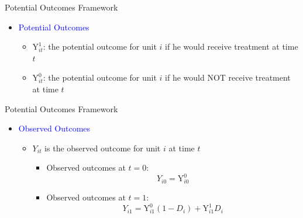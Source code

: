 \documentclass[dvipsnames,hyperref={pdfpagelabels=false}]{beamer}
\begin{document}
\begin{frame}{Potential Outcomes Framework}{}
\begin{itemize}
\item \textcolor{blue}{Potential Outcomes}
\vspace{0.2cm}
\begin{itemize}
\item $\mathrm{Y}^{1}_{it}$: the potential outcome for unit $i$ if he would receive treatment at time $t$
\vspace{0.2cm}
\item $\mathrm{Y}^{0}_{it}$: the potential outcome for unit $i$ if he would NOT receive treatment at time $t$
\end{itemize}

\end{itemize}
\end{frame}





\begin{frame}{Potential Outcomes Framework}{}
\begin{itemize}

\item \textcolor{blue}{Observed Outcomes}
\vspace{0.2cm}
\begin{itemize}
\item $Y_{it}$ is the observed outcome for unit $i$ at time $t$
\vspace{0.2cm}	


\begin{itemize}

\item Observed outcomes at $t=0$:
\begin{equation*}
Y_{i0}=\mathrm{Y}^{0}_{i0}
\end{equation*}
\item Observed outcomes at $t=1$: 
\begin{equation*}
Y_{i1}=\mathrm{Y}^{0}_{i1}(1-D_i)+\mathrm{Y}^{1}_{i1}D_i
\end{equation*}

\end{itemize}
\end{itemize}
\end{itemize}
\end{frame}
\end{document}
